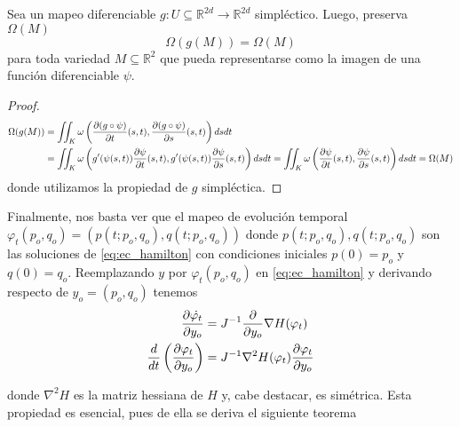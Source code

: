 \begin{theorem}{\label{teo:preservacion_vol}}
 Sea un mapeo diferenciable $g:U\subseteq\mathbb{R}^{2d}\to\mathbb{R}^{2d}$ simpléctico. Luego, preserva $\Omega(M)$ 
 \[ \Omega(g(M)) = \Omega(M) \]
 para toda variedad $M\subseteq\mathbb{R}^2$ que pueda representarse como la imagen de una función diferenciable $\psi$.
\end{theorem}
\begin{proof}
\begin{align*}
 \Omega(g(M)) &=  \iint_K \omega\left(\frac{\partial(g\circ\psi)}{\partial t}(s,t), \frac{\partial(g\circ\psi)}{\partial s}(s,t)\right) ds dt \\
&= \iint_K \omega\left(g'(\psi(s,t))\frac{\partial\psi}{\partial t}(s,t), g'(\psi(s,t))\frac{\partial\psi}{\partial s}(s,t)\right) ds dt = \iint_K \omega\left(\frac{\partial\psi}{\partial t}(s,t), \frac{\partial\psi}{\partial s}(s,t)\right) ds dt = \Omega(M) 
\end{align*}
donde utilizamos la propiedad de $g$ simpléctica. 
\end{proof}

Finalmente, nos basta ver que el mapeo de evolución temporal $\varphi_t(p_o,q_o) = (p(t;p_o,q_o), q(t;p_o,q_o))$ donde $p(t;p_o,q_o), q(t;p_o,q_o)$ son las soluciones de \eqref{eq:ec_hamilton}
con condiciones iniciales $p(0)=p_o$ y $q(0)=q_o$. 
Reemplazando $y$ por $\varphi_t(p_o,q_o)$ en \eqref{eq:ec_hamilton} y derivando respecto de $y_o=(p_o,q_o)$ tenemos
\begin{align*}
 \frac{\partial\dot{\varphi_t}}{\partial y_o} &= J^{-1}\frac{\partial}{\partial y_o} \nabla H(\varphi_t) \\
 \frac{d}{dt}\left(\frac{\partial\varphi_t}{\partial y_o}\right) &= J^{-1} \nabla^2 H(\varphi_t)\frac{\partial\varphi_t}{\partial y_o}
\end{align*}

donde $\nabla^2 H$ es la matriz hessiana de $H$ y, cabe destacar, es simétrica. Esta propiedad es esencial, pues de ella se deriva el siguiente teorema
 
